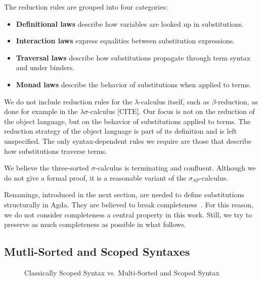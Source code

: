 \documentclass[screen,nonacm]{acmart}
\begin{document}
The reduction rules are grouped into four categories:
\begin{itemize}
      \item \textbf{Definitional laws} describe how variables are looked up in substitutions.
      \item \textbf{Interaction laws} express equalities between substitution expressions.
      \item \textbf{Traversal laws} describe how substitutions propagate through term syntax and under binders.
      \item \textbf{Monad laws} describe the behavior of substitutions when applied to terms.
\end{itemize}

We do not include reduction rules for the $\lambda$-calculus itself, such as
$\beta$-reduction, as done for example in the $\lambda\sigma$-calculus [CITE].
Our focus is not on the reduction of the object language, but on the behavior
of substitutions applied to terms. The reduction strategy of the object
language is part of its definition and is left unspecified. The only
syntax-dependent rules we require are those that describe how substitutions
traverse terms.

We believe the three-sorted $\sigma$-calculus is terminating and confluent.
Although we do not give a formal proof, it is a reasonable variant of the
$\sigma_{SP}$-calculus.

Renamings, introduced in the next section, are needed to define substitutions
structurally in Agda. They are believed to break completeness~\cite{CITE}. For
this reason, we do not consider completeness a central property in this work.
Still, we try to preserve as much completeness as possible in what follows.

\subsection{Mutli-Sorted and Scoped Syntaxes}\label{sec:pre-syn}
\begin{figure}[t]
      \centering
      \begin{minipage}[t]{0.48\linewidth}
            \raggedright{}
            \EScoped{}
      \end{minipage}
      \hfill
      \begin{minipage}[t]{0.48\linewidth}
            \raggedright{}
            \EMultiSorted{}
      \end{minipage}
      \caption{Classically Scoped Syntax vs. Multi-Sorted and Scoped Syntax}
      \label{fig:pre:svm}
\end{figure}
\end{document}
